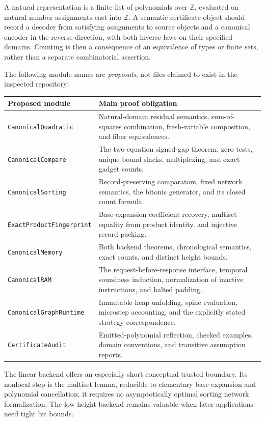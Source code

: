 \documentclass[11pt,a4paper]{article}
\theoremstyle{definition}
\theoremstyle{remark}
\newcommand{\Z}{\mathbb Z}
\begin{document}
A natural representation is a finite list of polynomials over $\Z$, evaluated
on natural-number assignments cast into $\Z$. A semantic certificate object
should record a decoder from satisfying assignments to source objects and a
canonical encoder in the reverse direction, with both inverse laws on their
specified domains. Counting is then a consequence of an equivalence of types
or finite sets, rather than a separate combinatorial assertion.

The following module names are \emph{proposals}, not files claimed to exist in
the inspected repository:
\begin{center}
\begin{tabularx}{\textwidth}{@{}p{}X@{}}
\toprule
Proposed module & Main proof obligation\\
\midrule
\texttt{CanonicalQuadratic} & Natural-domain residual semantics, sum-of-squares
combination, fresh-variable composition, and fiber equivalences.\\
\texttt{CanonicalCompare} & The two-equation signed-gap theorem, zero tests,
unique bound slacks, multiplexing, and exact gadget counts.\\
\texttt{CanonicalSorting} & Record-preserving comparators, fixed network
semantics, the bitonic generator, and its closed count formula.\\
\texttt{ExactProductFingerprint} & Base-expansion coefficient recovery,
multiset equality from product identity, and injective record packing.\\
\texttt{CanonicalMemory} & Both backend theorems, chronological semantics,
exact counts, and distinct height bounds.\\
\texttt{CanonicalRAM} & The request-before-response interface, temporal
soundness induction, normalization of inactive instructions, and halted padding.\\
\texttt{CanonicalGraphRuntime} & Immutable heap unfolding, spine evaluation,
microstep accounting, and the explicitly stated strategy correspondence.\\
\texttt{CertificateAudit} & Emitted-polynomial reflection, checked examples,
domain conventions, and transitive assumption reports.\\
\bottomrule
\end{tabularx}
\end{center}

The linear backend offers an especially short conceptual trusted boundary.
Its nonlocal step is the multiset lemma, reducible to elementary base expansion
and polynomial cancellation; it requires no asymptotically optimal sorting
network formalization. The low-height backend remains valuable when later
applications need tight bit bounds.
\end{document}
